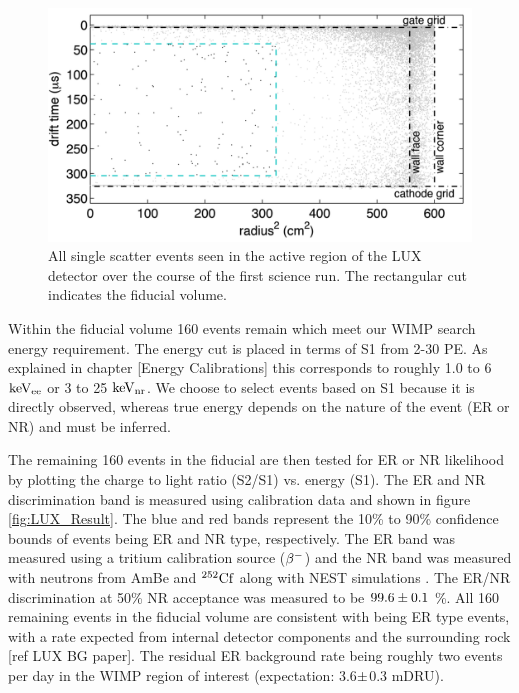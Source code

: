  \begin{figure}[h!]\centering
\includegraphics[width=130mm]{Chapter_LUX_Det/LUX_Result_Event.png}
\caption{All single scatter events seen in the active region of the LUX detector over the course of the first science run. The rectangular cut indicates the fiducial volume.}
\label{fig:LUX_Result_Event}
\end{figure}

Within the fiducial volume 160 events remain which meet our WIMP search energy requirement. The energy cut is placed in terms of S1 from 2-30 PE. As explained in chapter [Energy Calibrations] this corresponds to roughly 1.0 to 6 $\rm keV_{ee}$ or 3 to 25 $\rm keV_{nr}$. We choose to select events based on S1 because it is directly observed, whereas true energy depends on the nature of the event (ER or NR) and must be inferred. %

The remaining 160 events in the fiducial are then tested for ER or NR likelihood by plotting the charge to light ratio (S2/S1) vs. energy (S1). The ER and NR discrimination band is measured using calibration data and shown in figure \ref{fig:LUX_Result}. The blue and red bands represent the 10\% to 90\% confidence bounds of events being ER and NR type, respectively. The ER band was measured using a tritium calibration source ($\rm \beta^{-}$) and the NR band was measured with neutrons from AmBe and $\rm^{252}Cf$ along with NEST simulations \cite{NEST_2013}. The ER/NR discrimination at 50\% NR acceptance was measured to be $\rm 99.6\pm0.1$ \%. All 160 remaining events in the fiducial volume are consistent with being ER type events, with a rate expected from internal detector components and the surrounding rock [ref LUX BG paper]. The residual ER background rate being roughly two events per day in the WIMP region of interest (expectation: 3.6$\rm\pm$0.3 mDRU).



